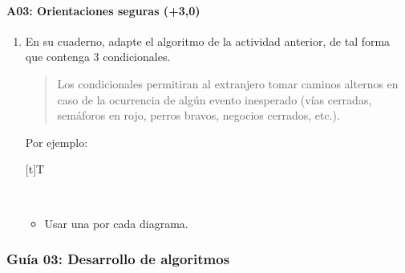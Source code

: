 \documentclass[letterpaper,10pt,spanish]{sphinxmanual}
\let\sphinxpxdimen\pdfpxdimen\else\newdimen\sphinxpxdimen
\begin{document}
\paragraph{A03: Orientaciones seguras (+3,0)}
\label{\detokenize{cursos/ofimatica11/periodo01/G02:a03-orientaciones-seguras-3-0}}
\sphinxAtStartPar
{}
\begin{enumerate}
%
\item {} 
\sphinxAtStartPar
En su cuaderno, adapte el algoritmo de la actividad anterior, de tal forma que contenga 3 condicionales.
\begin{quote}

\sphinxAtStartPar
Los condicionales permitiran al extranjero tomar caminos alternos en caso de la ocurrencia de algún evento inesperado (vías cerradas, semáforos en rojo, perros bravos, negocios cerrados, etc.).
\end{quote}

\sphinxAtStartPar
Por ejemplo:


\begin{savenotes}\sphinxattablestart
\sphinxthistablewithglobalstyle
\centering
\begin{tabulary}{\linewidth}[t]{T}
\sphinxtoprule
\sphinxtableatstartofbodyhook

\begin{sphinxfigure-in-table}
\centering
\capstart
\noindent\sphinxincludegraphics[width=700\sphinxpxdimen]{{image062}.png}
\label{\detokenize{cursos/ofimatica11/periodo01/G02:id3}}\end{sphinxfigure-in-table}\relax
\\
\sphinxbottomrule
\end{tabulary}
\sphinxtableafterendhook\par
\sphinxattableend\end{savenotes}
\begin{itemize}
\item {} 
\sphinxAtStartPar
Usar una  por cada diagrama.

\end{itemize}

\end{enumerate}

\sphinxstepscope


\subsubsection{Guía 03: Desarrollo de algoritmos}
\label{\detokenize{cursos/ofimatica11/periodo01/G03:guia-03-desarrollo-de-algoritmos}}\label{\detokenize{cursos/ofimatica11/periodo01/G03::doc}}
\end{document}
